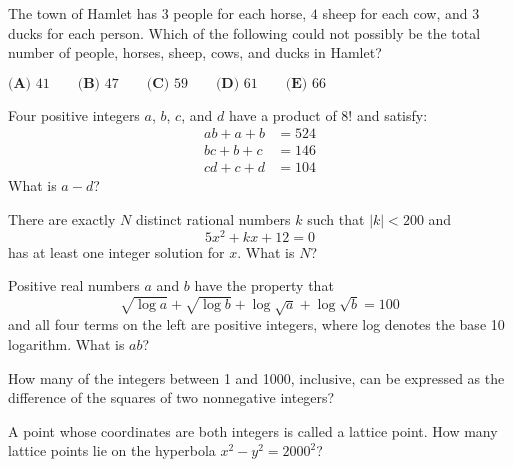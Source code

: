 \documentclass[mast]{lucky}
\begin{document}
\begin{prob}[AMC 10B 2015/15]{1}

The town of Hamlet has $3$ people for each horse, $4$ sheep for each cow, and $3$ ducks for each person. Which of the following could not possibly be the total number of people, horses, sheep, cows, and ducks in Hamlet?
\begin{center}
    $\textbf{(A) }41\qquad\textbf{(B) }47\qquad\textbf{(C) }59\qquad\textbf{(D) }61\qquad\textbf{(E) }66$
\end{center}

\end{prob}

\begin{prob}[AMC 12 2001/21]{2}

Four positive integers $a$, $b$, $c$, and $d$ have a product of $8!$ and satisfy:
\begin{align*} ab + a + b & = 524 \\  bc + b + c & = 146 \\  cd + c + d & = 104 \end{align*}
What is $a-d$?

\end{prob}

\begin{prob}[AMC 12A 2014/19]{2}

There are exactly $N$ distinct rational numbers $k$ such that $|k|<200$ and\[5x^2+kx+12=0\]has at least one integer solution for $x$. What is $N$?

\end{prob}

\begin{prob}[AMC 12A 2019/15]{2}

Positive real numbers $a$ and $b$ have the property that\[\sqrt{\log{a}} + \sqrt{\log{b}} + \log \sqrt{a} + \log \sqrt{b} = 100\]and all four terms on the left are positive integers, where log denotes the base 10 logarithm. What is $ab$?

\end{prob}

\begin{prob}[AIME 1997/1]{3}

How many of the integers between 1 and 1000, inclusive, can be expressed as the difference of the squares of two nonnegative integers?

\end{prob}

\begin{prob}[AIME II 2000/2]{4}

A point whose coordinates are both integers is called a lattice point. How many lattice points lie on the hyperbola $x^2 -y^2 = 2000^2$?

\end{prob}
\end{document}
